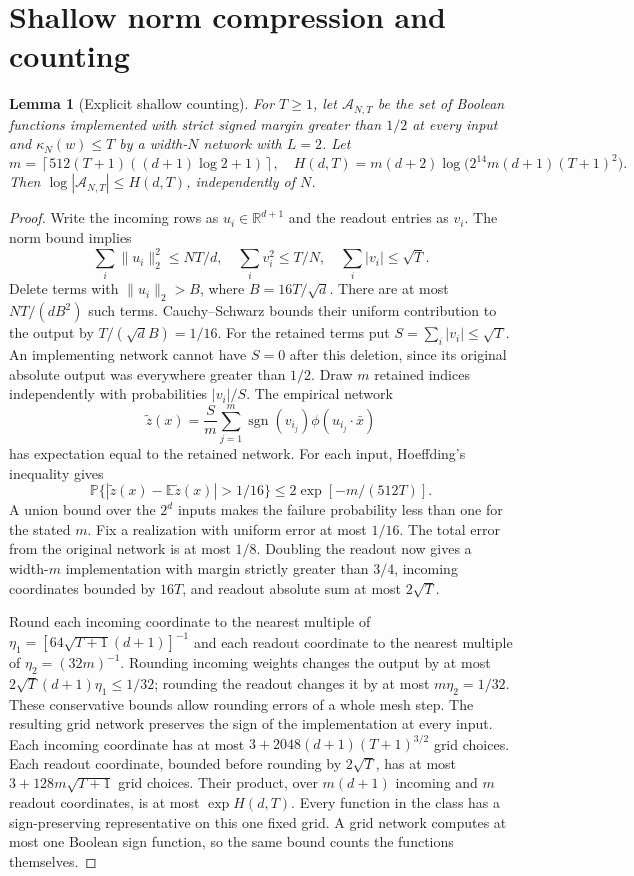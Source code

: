 \documentclass[11pt]{article}
\newtheorem{lemma}[theorem]{Lemma}
\theoremstyle{remark}\newtheorem{remark}[theorem]{Remark}
\newcommand{\E}{\mathbb E}\newcommand{\Prb}{\mathbb P}\newcommand{\R}{\mathbb R}
\begin{document}
\section{Shallow norm compression and counting}
\begin{lemma}[Explicit shallow counting]\label{lem:count}
For $T\geq1$, let $\mathcal A_{N,T}$ be the set of Boolean functions
implemented with strict signed margin greater than $1/2$ at every input
and $\kappa_N(w)\leq T$ by a width-$N$ network with $L=2$.
Let
\[
 m=\left\lceil512(T+1)((d+1)\log2+1)\right\rceil,
 \quad
 H(d,T)=m(d+2)\log\bigl(2^{14}m(d+1)(T+1)^2\bigr).
\]
Then $\log|\mathcal A_{N,T}|\leq H(d,T)$, independently of $N$.
\end{lemma}
\begin{proof}
Write the incoming rows as $u_i\in\R^{d+1}$ and the readout entries as $v_i$.
The norm bound implies
\[
 \sum_i\|u_i\|_2^2\leq NT/d,\quad
 \sum_i v_i^2\leq T/N,\quad
 \sum_i|v_i|\leq\sqrt T.
\]
Delete terms with $\|u_i\|_2>B$, where $B=16T/\sqrt d$.
There are at most $NT/(dB^2)$ such terms. Cauchy--Schwarz bounds their
uniform contribution to the output by $T/(\sqrt d B)=1/16$.
For the retained terms put $S=\sum_i|v_i|\leq\sqrt T$.
An implementing network cannot have $S=0$ after this deletion, since its
original absolute output was everywhere greater than $1/2$.
Draw $m$ retained indices independently with probabilities $|v_i|/S$.
The empirical network
\[
 \widetilde z(x)=\frac S m\sum_{j=1}^m
      \operatorname{sgn}(v_{i_j})\phi(u_{i_j}\cdot\bar x)
\]
has expectation equal to the retained network. For each input, Hoeffding's
inequality gives
\[
 \Prb\{|\widetilde z(x)-\E\widetilde z(x)|>1/16\}
 \leq2\exp[-m/(512T)].
\]
A union bound over the $2^d$ inputs makes the failure probability less than one
for the stated $m$. Fix a realization with uniform error at most $1/16$.
The total error from the original network is at most $1/8$.
Doubling the readout now gives a width-$m$ implementation with margin
strictly greater than $3/4$, incoming coordinates bounded by $16T$, and
readout absolute sum at most $2\sqrt T$.

Round each incoming coordinate to the nearest multiple of
$\eta_1=[64\sqrt{T+1}(d+1)]^{-1}$ and each readout coordinate to the nearest
multiple of $\eta_2=(32m)^{-1}$. Rounding incoming weights changes the output
by at most $2\sqrt T(d+1)\eta_1\leq1/32$; rounding the readout changes it by
at most $m\eta_2=1/32$. These conservative bounds allow rounding errors of a
whole mesh step. The resulting grid network preserves the sign of the
implementation at every input.
Each incoming coordinate has at most $3+2048(d+1)(T+1)^{3/2}$ grid choices.
Each readout coordinate, bounded before rounding by $2\sqrt T$, has at most
$3+128m\sqrt{T+1}$ grid choices. Their product, over $m(d+1)$ incoming and
$m$ readout coordinates, is at most $\exp H(d,T)$.
Every function in the class has a sign-preserving representative on this one
fixed grid. A grid network computes at most one Boolean sign function, so the
same bound counts the functions themselves.
\end{proof}
\end{document}
